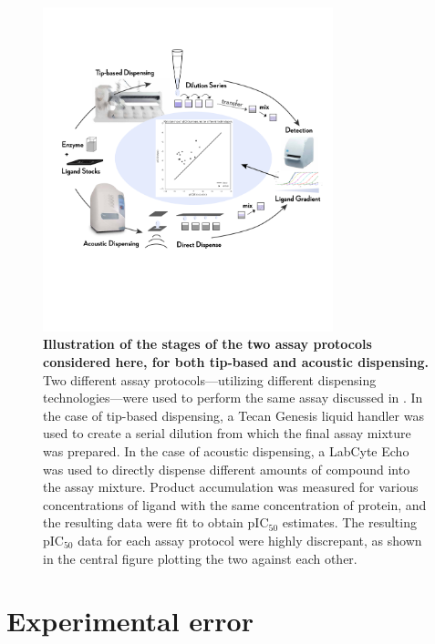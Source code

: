 \documentclass[aps,pre,twocolumn,nofootinbib,superscriptaddress,linenumbers]{revtex4-1}
\begin{document}
\begin{figure}[tb]
   \includegraphics[trim={0 15cm 0 8cm},clip,width=0.75\textwidth]{../figures/Fig1-4.pdf}
  \caption{{\bf Illustration of the stages of the two assay protocols considered here, for both tip-based and acoustic dispensing.}
  Two different assay protocols---utilizing different dispensing technologies---were used to perform the same assay discussed in \citep{ekins_dispensing_2013}.
  In the case of tip-based dispensing, a Tecan Genesis liquid handler was used to create a serial dilution from which the final assay mixture was prepared. 
  In the case of acoustic dispensing, a LabCyte Echo was used to directly dispense different amounts of compound into the assay mixture.
  Product accumulation was measured for various concentrations of ligand with the same concentration of protein, and the resulting data were fit to obtain pIC$_{50}$ estimates.
  The resulting pIC$_{50}$ data for each assay protocol were highly discrepant, as shown in the central figure plotting the two against each other.
   }
  \label{fig:overview}
\end{figure}


\section{Experimental error}
\end{document}
